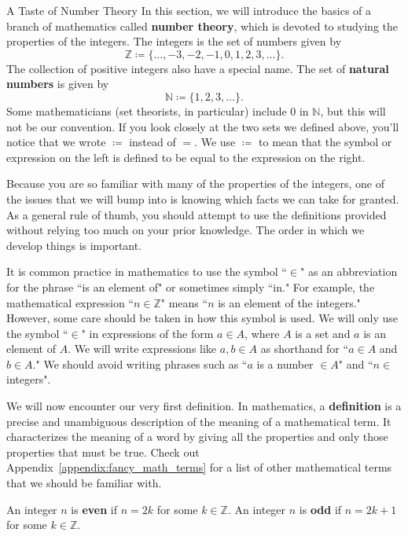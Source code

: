 \begin{section}{A Taste of Number Theory}
In this section, we will introduce the basics of a branch of mathematics called \textbf{number theory}, which is devoted to studying the properties of the integers. The integers is the set of numbers given by
\[
\boxed{\mathbb{Z} \coloneqq  \{\ldots, -3, -2, -1, 0, 1, 2, 3, \ldots\}}.
\]
The collection of positive integers also have a special name.  The set of \textbf{natural numbers} is given by
\[
\boxed{\mathbb{N}\coloneqq \{1,2,3,\ldots\}}.
\]
Some mathematicians (set theorists, in particular) include $0$ in $\mathbb{N}$, but this will not be our convention. If you look closely at the two sets we defined above, you'll notice that we wrote $\boxed{\coloneqq }$ instead of $=$.  We use $\coloneqq $ to mean that the symbol or expression on the left is defined to be equal to the expression on the right.

Because you are so familiar with many of the properties of the integers, one of the issues that we will bump into is knowing which facts we can take for granted.  As a general rule of thumb, you should attempt to use the definitions provided without relying too much on your prior knowledge.  The order in which we develop things is important.

It is common practice in mathematics to use the symbol ``$\in$" as an abbreviation for the phrase ``is an element of" or sometimes simply ``in."  For example, the mathematical expression ``$n\in\mathbb{Z}$" means ``$n$ is an element of the integers."  However, some care should be taken in how this symbol is used. We will only use the symbol ``$\in$" in expressions of the form $\boxed{a \in A}$, where $A$ is a set and $a$ is an element of $A$.  We will write  expressions like $\boxed{a,b\in A}$  as shorthand for ``$a\in A$ and $b\in A$." We should avoid writing phrases such as ``$a$ is a number $\in A$" and ``$n \in$ integers".

We will now encounter our very first definition.  In mathematics, a \textbf{definition} is a precise and unambiguous description of the meaning of a mathematical term.  It characterizes the meaning of a word by giving all the properties and only those properties that must be true.  Check out Appendix~\ref{appendix:fancy_math_terms} for a list of other mathematical terms that we should be familiar with.

\begin{definition}
An integer $n$ is \textbf{even} if $n=2k$ for some $k\in\mathbb{Z}$. An integer $n$ is \textbf{odd} if $n=2k+1$ for some $k\in\mathbb{Z}$.
\end{definition}


\end{section}
